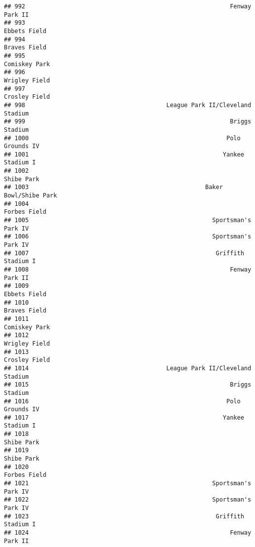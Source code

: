 \documentclass[]{article}
\begin{document}
\begin{verbatim}
## 992                                                          Fenway Park II
## 993                                                            Ebbets Field
## 994                                                            Braves Field
## 995                                                           Comiskey Park
## 996                                                           Wrigley Field
## 997                                                           Crosley Field
## 998                                        League Park II/Cleveland Stadium
## 999                                                          Briggs Stadium
## 1000                                                        Polo Grounds IV
## 1001                                                       Yankee Stadium I
## 1002                                                             Shibe Park
## 1003                                                  Baker Bowl/Shibe Park
## 1004                                                           Forbes Field
## 1005                                                    Sportsman's Park IV
## 1006                                                    Sportsman's Park IV
## 1007                                                     Griffith Stadium I
## 1008                                                         Fenway Park II
## 1009                                                           Ebbets Field
## 1010                                                           Braves Field
## 1011                                                          Comiskey Park
## 1012                                                          Wrigley Field
## 1013                                                          Crosley Field
## 1014                                       League Park II/Cleveland Stadium
## 1015                                                         Briggs Stadium
## 1016                                                        Polo Grounds IV
## 1017                                                       Yankee Stadium I
## 1018                                                             Shibe Park
## 1019                                                             Shibe Park
## 1020                                                           Forbes Field
## 1021                                                    Sportsman's Park IV
## 1022                                                    Sportsman's Park IV
## 1023                                                     Griffith Stadium I
## 1024                                                         Fenway Park II

\end{verbatim}
\end{document}
